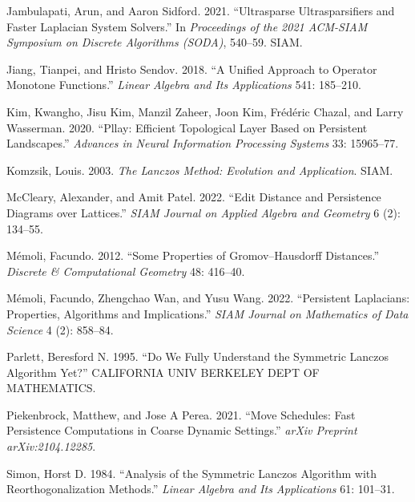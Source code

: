 \documentclass[
  letterpaper,
  DIV=11,
  numbers=noendperiod,
  oneside]{scrartcl}
\newlength{\cslhangindent}
\newlength{\cslentryspacingunit} %
\newenvironment{CSLReferences}[2] %
 {%
  \setlength{\parindent}{0pt}
  \ifodd #1
  \let\oldpar\par
  \def\par{\hangindent=\cslhangindent\oldpar}
  \fi
  \setlength{\parskip}{#2\cslentryspacingunit}
 }%
 {}
\begin{document}
\begin{CSLReferences}{1}{0}
\leavevmode{}%
Jambulapati, Arun, and Aaron Sidford. 2021. {``Ultrasparse
Ultrasparsifiers and Faster Laplacian System Solvers.''} In
\emph{Proceedings of the 2021 ACM-SIAM Symposium on Discrete Algorithms
(SODA)}, 540--59. SIAM.

\leavevmode{}%
Jiang, Tianpei, and Hristo Sendov. 2018. {``A Unified Approach to
Operator Monotone Functions.''} \emph{Linear Algebra and Its
Applications} 541: 185--210.

\leavevmode{}%
Kim, Kwangho, Jisu Kim, Manzil Zaheer, Joon Kim, Frédéric Chazal, and
Larry Wasserman. 2020. {``Pllay: Efficient Topological Layer Based on
Persistent Landscapes.''} \emph{Advances in Neural Information
Processing Systems} 33: 15965--77.

\leavevmode{}%
Komzsik, Louis. 2003. \emph{The Lanczos Method: Evolution and
Application}. SIAM.

\leavevmode{}%
McCleary, Alexander, and Amit Patel. 2022. {``Edit Distance and
Persistence Diagrams over Lattices.''} \emph{SIAM Journal on Applied
Algebra and Geometry} 6 (2): 134--55.

\leavevmode{}%
Mémoli, Facundo. 2012. {``Some Properties of Gromov--Hausdorff
Distances.''} \emph{Discrete \& Computational Geometry} 48: 416--40.

\leavevmode{}%
Mémoli, Facundo, Zhengchao Wan, and Yusu Wang. 2022. {``Persistent
Laplacians: Properties, Algorithms and Implications.''} \emph{SIAM
Journal on Mathematics of Data Science} 4 (2): 858--84.

\leavevmode{}%
Parlett, Beresford N. 1995. {``Do We Fully Understand the Symmetric
Lanczos Algorithm Yet?''} CALIFORNIA UNIV BERKELEY DEPT OF MATHEMATICS.

\leavevmode{}%
Piekenbrock, Matthew, and Jose A Perea. 2021. {``Move Schedules: Fast
Persistence Computations in Coarse Dynamic Settings.''} \emph{arXiv
Preprint arXiv:2104.12285}.

\leavevmode{}%
Simon, Horst D. 1984. {``Analysis of the Symmetric Lanczos Algorithm
with Reorthogonalization Methods.''} \emph{Linear Algebra and Its
Applications} 61: 101--31.


\end{CSLReferences}
\end{document}
